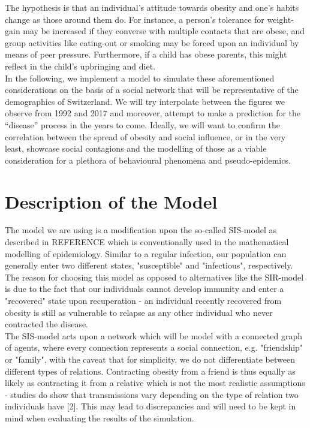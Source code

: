 \documentclass[11pt]{article}
\begin{document}
The hypothesis is that an individual’s attitude towards obesity and one’s habits change as those around them do. For instance, a person’s tolerance for weight-gain may be increased if they converse with multiple contacts that are obese, and group activities like eating-out or smoking may be forced upon an individual by means of peer pressure. Furthermore, if a child has obese parents, this might reflect in the child’s upbringing and diet.\\

In the following, we implement a model to simulate these aforementioned considerations on the basis of a social network that will be representative of the demographics of Switzerland. We will try interpolate between the figures we observe from 1992 and 2017 and moreover, attempt to make a prediction for the “disease” process in the years to come. Ideally, we will want to confirm the correlation between the spread of obesity and social influence, or in the very least, showcase social contagions and the modelling of those as a viable consideration for a plethora of behavioural phenomena and pseudo-epidemics.


\section{Description of the Model}

The model we are using is a modification upon the so-called SIS-model as described in REFERENCE which is conventionally used in the mathematical modelling of epidemiology. Similar to a regular infection, our population can generally enter two different states, "susceptible" and "infectious", respectively. The reason for choosing this model as opposed to alternatives like the SIR-model is due to the fact that our individuals cannot develop immunity and enter a "recovered" state upon recuperation - an individual recently recovered from obesity is still as vulnerable to relapse as any other individual who never contracted the disease.  \\

The SIS-model acts upon a network which will be model with a connected graph of agents, where every connection represents a social connection, e.g. "friendship" or "family", with the caveat that for simplicity, we do not differentiate between different types of relations. Contracting obesity from a friend is thus equally as likely as contracting it from a relative which is not the most realistic assumptions - studies do show that transmissions vary depending on the type of relation two individuals have [2]. This may lead to discrepancies and  will need to be kept in mind when evaluating the results of the simulation. \\
\end{document}
